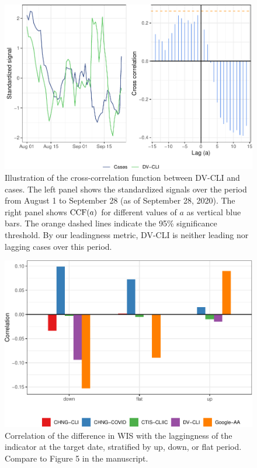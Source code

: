 \documentclass[9pt,twoside,lineno]{pnas-new}
\begin{document}
\begin{figure}

{\centering \includegraphics[width=\textwidth]{fig/ccf-dv-finalized-1} 

}

\caption{Illustration of the cross-correlation function between DV-CLI and cases. The left panel shows the standardized signals over the period from August 1 to September 28 (as of September 28, 2020). The right panel shows $\mathrm{CCF}(a)$ for different values of $a$ as vertical blue bars. The orange dashed lines indicate the 95\% significance threshold. By our leadingness metric, DV-CLI is neither leading nor lagging cases over this period.}\label{fig:ccf-dv-finalized}
\end{figure}

\clearpage

\begin{figure}

{\centering \includegraphics[width=\textwidth]{fig/lagging-only-1} 

}

\caption{Correlation of the difference in WIS with the  laggingness of the indicator at the target date, stratified by up, down, or flat period. Compare to Figure 5 in the manuscript.}\label{fig:lagging-only}
\end{figure}
\end{document}

